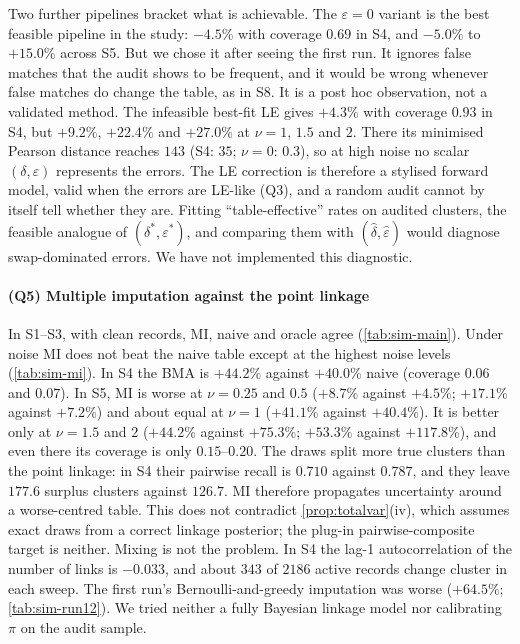Two further pipelines bracket what is achievable. The $\varepsilon=0$ variant is the best feasible pipeline in the study: $-4.5\%$ with coverage $0.69$ in S4, and $-5.0\%$ to $+15.0\%$ across S5. But we chose it after seeing the first run. It ignores false matches that the audit shows to be frequent, and it would be wrong whenever false matches do change the table, as in S8. It is a post hoc observation, not a validated method. The infeasible best-fit LE gives $+4.3\%$ with coverage $0.93$ in S4, but $+9.2\%$, $+22.4\%$ and $+27.0\%$ at $\nu=1$, $1.5$ and $2$. There its minimised Pearson distance reaches $143$ (S4: $35$; $\nu=0$: $0.3$), so at high noise no scalar $(\delta,\varepsilon)$ represents the errors. The LE correction is therefore a stylised forward model, valid when the errors are LE-like (Q3), and a random audit cannot by itself tell whether they are. Fitting ``table-effective'' rates on audited clusters, the feasible analogue of $(\delta^\ast,\varepsilon^\ast)$, and comparing them with $(\hat\delta,\hat\varepsilon)$ would diagnose swap-dominated errors. We have not implemented this diagnostic.

\paragraph{(Q5) Multiple imputation against the point linkage} In S1--S3, with clean records, MI, naive and oracle agree (\cref{tab:sim-main}). Under noise MI does not beat the naive table except at the highest noise levels (\cref{tab:sim-mi}). In S4 the BMA is $+44.2\%$ against $+40.0\%$ naive (coverage $0.06$ and $0.07$). In S5, MI is worse at $\nu=0.25$ and $0.5$ ($+8.7\%$ against $+4.5\%$; $+17.1\%$ against $+7.2\%$) and about equal at $\nu=1$ ($+41.1\%$ against $+40.4\%$). It is better only at $\nu=1.5$ and $2$ ($+44.2\%$ against $+75.3\%$; $+53.3\%$ against $+117.8\%$), and even there its coverage is only $0.15$--$0.20$. The draws split more true clusters than the point linkage: in S4 their pairwise recall is $0.710$ against $0.787$, and they leave $177.6$ surplus clusters against $126.7$. MI therefore propagates uncertainty around a worse-centred table. This does not contradict \cref{prop:totalvar}(iv), which assumes exact draws from a correct linkage posterior; the plug-in pairwise-composite target is neither. Mixing is not the problem. In S4 the lag-1 autocorrelation of the number of links is $-0.033$, and about $343$ of $2186$ active records change cluster in each sweep. The first run's Bernoulli-and-greedy imputation was worse ($+64.5\%$; \cref{tab:sim-run12}). We tried neither a fully Bayesian linkage model nor calibrating $\pi$ on the audit sample.

